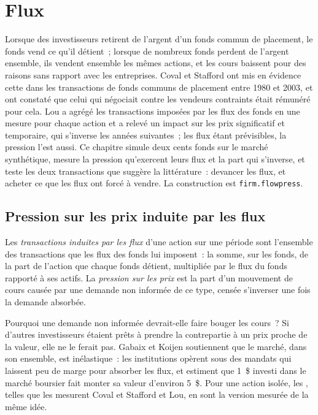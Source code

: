 \chapter{Flux}\label{ch:s1:flows}

Lorsque des investisseurs retirent de l'argent d'un fonds commun de placement, le fonds vend ce qu'il détient~; lorsque de nombreux fonds perdent de l'argent ensemble, ils vendent ensemble les mêmes actions, et
les cours baissent pour des raisons sans rapport avec les entreprises. Coval et Stafford ont mis en évidence cette  dans les transactions de fonds communs de placement entre 1980 et
2003, et ont constaté que celui qui négociait contre les vendeurs contraints était rémunéré pour cela. Lou a agrégé les transactions imposées par les flux des fonds en une mesure pour chaque
action et a relevé un impact sur les prix significatif et temporaire, qui s'inverse les années suivantes~; les flux étant prévisibles, la pression l'est aussi. Ce chapitre
simule deux cents fonds sur le marché synthétique, mesure la pression qu'exercent leurs flux et la part qui s'inverse, et teste les deux transactions que
suggère la littérature~: devancer les flux, et acheter ce que les flux ont forcé à vendre. La construction est \texttt{firm.flowpress}.

\section{Pression sur les prix induite par les flux}

\begin{definition}\label{def:s1:flows:fit}
Les \emph{transactions induites par les flux} d'une action sur une période sont l'ensemble des transactions que les flux des fonds lui imposent~: la somme, sur les fonds, de la part de
l'action que chaque fonds détient, multipliée par le flux du fonds rapporté à ses actifs. La \emph{pression sur les prix} est la part d'un mouvement de cours causée par
une demande non informée de ce type, censée s'inverser une fois la demande absorbée.
\end{definition}

Pourquoi une demande non informée devrait-elle faire bouger les cours~? Si d'autres investisseurs étaient prêts à prendre la contrepartie à un prix proche de la valeur, elle ne le ferait pas. Gabaix et
Koijen soutiennent que le marché, dans son ensemble, est inélastique~: les institutions opèrent sous des mandats qui laissent peu de marge pour absorber les flux, et estiment que
1~\$ investi dans le marché boursier fait monter sa valeur d'environ 5~\$. Pour une action isolée, les , telles que les mesurent Coval et Stafford et Lou, en sont la
version mesurée de la même idée.


